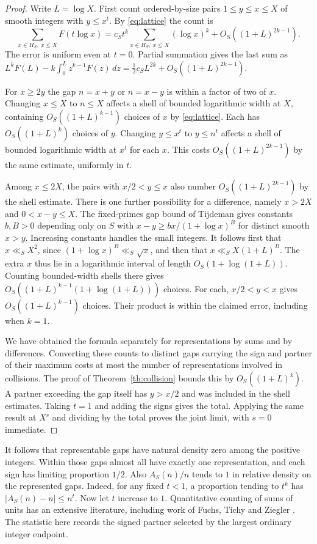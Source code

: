 \documentclass[11pt,letterpaper]{article}
\newcommand{\Hs}{H_S}
\begin{document}
\begin{proof}
Write $L=\log X$. First count ordered-by-size pairs $1\le y\le x\le X$ of smooth integers with $y\le x^t$. By \eqref{eq:lattice} the count is
\[
 \sum_{x\in\Hs,\ x\le X} F(t\log x)
  = c_S t^k \sum_{x\in\Hs,\ x\le X} (\log x)^k
    +O_S((1+L)^{2k-1}).
\]
The error is uniform even at $t=0$. Partial summation gives the last sum as
$L^kF(L)-k\int_0^L z^{k-1}F(z)\,dz
=\tfrac12 c_S L^{2k}+O_S((1+L)^{2k-1})$.

For $x\ge2y$ the gap $n=x+y$ or $n=x-y$ is within a factor of two of $x$. Changing $x\le X$ to $n\le X$ affects a shell of bounded logarithmic width at $X$, containing $O_S((1+L)^{k-1})$ choices of $x$ by \eqref{eq:lattice}. Each has $O_S((1+L)^k)$ choices of $y$. Changing $y\le x^t$ to $y\le n^t$ affects a shell of bounded logarithmic width at $x^t$ for each $x$. This costs $O_S((1+L)^{2k-1})$ by the same estimate, uniformly in $t$.

Among $x\le2X$, the pairs with $x/2<y\le x$ also number $O_S((1+L)^{2k-1})$ by the shell estimate. There is one further possibility for a difference, namely $x>2X$ and $0<x-y\le X$. The fixed-primes gap bound of Tijdeman \cite{tijdeman} gives constants $b,B>0$ depending only on $S$ with $x-y\ge b x/(1+\log x)^B$ for distinct smooth $x>y$. Increasing constants handles the small integers. It follows first that $x\ll_S X^2$, since $(1+\log x)^B\ll_S\sqrt{x}$, and then that $x\ll_S X(1+L)^B$. The extra $x$ thus lie in a logarithmic interval of length $O_S(1+\log(1+L))$. Counting bounded-width shells there gives $O_S((1+L)^{k-1}(1+\log(1+L)))$ choices. For each, $x/2<y<x$ gives $O_S((1+L)^{k-1})$ choices. Their product is within the claimed error, including when $k=1$.

We have obtained the formula separately for representations by sums and by differences. Converting these counts to distinct gaps carrying the sign and partner of their maximum costs at most the number of representations involved in collisions. The proof of Theorem~\ref{th:collision} bounds this by $O_S((1+L)^k)$. A partner exceeding the gap itself has $y>x/2$ and was included in the shell estimates. Taking $t=1$ and adding the signs gives the total. Applying the same result at $X^s$ and dividing by the total proves the joint limit, with $s=0$ immediate.
\end{proof}

It follows that representable gaps have natural density zero among the positive integers. Within those gaps almost all have exactly one representation, and each sign has limiting proportion $1/2$. Also $A_S(n)/n$ tends to $1$ in relative density on the represented gaps. Indeed, for any fixed $t<1$, a proportion tending to $t^k$ has $|A_S(n)-n|\le n^t$. Now let $t$ increase to $1$. Quantitative counting of sums of units has an extensive literature, including work of Fuchs, Tichy and Ziegler \cite{ftz}. The statistic here records the signed partner selected by the largest ordinary integer endpoint.
\end{document}
